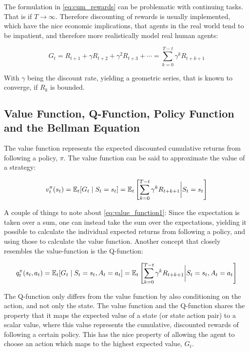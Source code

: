 The formulation in \eqref{eq:cum_rewards} can be problematic with continuing tasks. That is if $T \rightarrow \infty$. Therefore discounting of rewards is usually implemented, which have the nice economic implications, that agents in the real world tend to be impatient, and therefore more realistically model real human agents:

\begin{equation}
    G_t = R_{t+1} + \gamma R_{t+2} + \gamma^2 R_{t+3} + \cdots = \sum_{k=0}^{T - t} \gamma^k R_{t+k+1}
\end{equation}

With $\gamma$ being the discount rate, yielding a geometric series, that is known to converge, if $R_k$ is bounded.

\subsection{Value Function, Q-Function, Policy Function and the Bellman Equation}

The value function represents the expected discounted cumulative returns from following a policy, $\pi$. The value function can be said to approximate the value of a strategy:

\begin{equation}\label{eq:value_function1}
    v_{t}^{\pi}(s_t) = \mathbb{E}_t [G_t \mid S_t = s_t] = \mathbb{E}_t \left[ \sum_{k=0}^{T - t} \gamma^k R_{t+k+1} \bigg\vert S_t = s_t \right] 
\end{equation}


A couple of things to note about \eqref{eq:value_function1}: Since the expectation is taken over a sum, one can instead take the sum over the expectations, yielding it possible to calculate the individual expected returns from following a policy, and using those to calculate the value function. Another concept that closely resembles the value-function is the Q-function:

\begin{equation}
    q_t^{\pi} (s_t, a_t) = \mathbb{E}_t [G_t \mid S_t = s_t, A_t = a_t ] = \mathbb{E}_t \left[ \sum_{k=0}^{T - t} \gamma^k R_{t+k+1} \bigg\vert S_t = s_t, A_t = a_t\right] 
\end{equation}

The Q-function only differs from the value function by also conditioning on the action, and not only the state. The value function and the Q-function shares the property that it maps the expected value of a state (or state action pair) to a scalar value, where this value represents the cumulative, discounted rewards of following a certain policy. This has the nice property of allowing the agent to choose an action which maps to the highest expected value, $G_t$.

